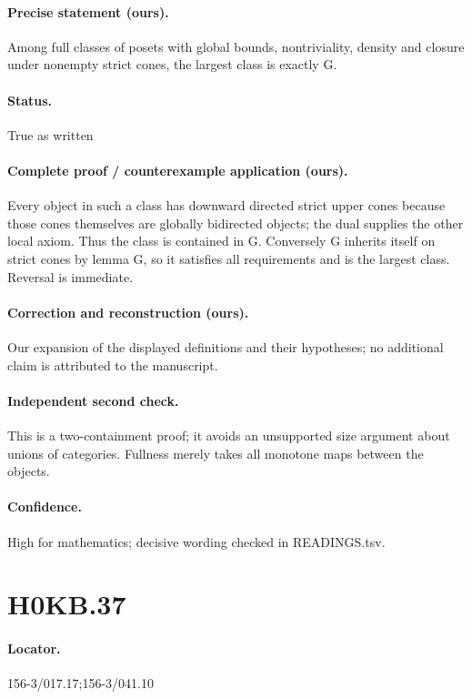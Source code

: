\paragraph{Precise statement (ours).} Among full classes of posets with global bounds, nontriviality, density and closure under nonempty strict cones, the largest class is exactly G.

\paragraph{Status.} True as written

\paragraph{Complete proof / counterexample application (ours).} Every object in such a class has downward directed strict upper cones because those cones themselves are globally bidirected objects; the dual supplies the other local axiom. Thus the class is contained in G. Conversely G inherits itself on strict cones by lemma G, so it satisfies all requirements and is the largest class. Reversal is immediate.

\paragraph{Correction and reconstruction (ours).} Our expansion of the displayed definitions and their hypotheses; no additional claim is attributed to the manuscript.

\paragraph{Independent second check.} This is a two-containment proof; it avoids an unsupported size argument about unions of categories. Fullness merely takes all monotone maps between the objects.

\paragraph{Confidence.} High for mathematics; decisive wording checked in READINGS.tsv.

\section*{H0KB.37}\label{statement:H0KB.37}
\paragraph{Locator.} 156-3/017.17;156-3/041.10

